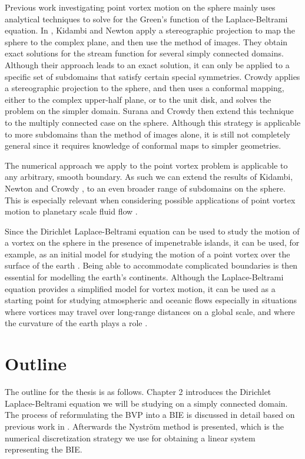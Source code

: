 \documentclass{sfuthesis}
\begin{document}
Previous work investigating point vortex motion on the sphere mainly uses analytical techniques to solve for the Green's function of the Laplace-Beltrami equation. In \cite{Kid2000}, Kidambi and Newton apply a stereographic projection to map the sphere to the complex plane, and then use the method of images. They obtain exact solutions for the stream function for several simply connected domains. Although their approach leads to an exact solution, it can only be applied to a specific set of subdomains that satisfy certain special symmetries. Crowdy \cite{Crowdy2006} applies a stereographic projection to the sphere, and then uses a conformal mapping, either to the complex upper-half plane, or to the unit disk, and solves the problem on the simpler domain. Surana and Crowdy \cite{SurCrow2008} then extend this technique to the multiply connected case on the sphere. Although this strategy is applicable to more subdomains than the method of images alone, it is still not completely general since it requires knowledge of conformal maps to simpler geometries. 

The numerical approach we apply to the point vortex problem is applicable to any arbitrary, smooth boundary. As such we can extend the results of Kidambi, Newton and Crowdy \cite{Kid2000, Crowdy2006}, to an even broader range of subdomains on the sphere. This is especially relevant when considering possible applications of point vortex motion to planetary scale fluid flow \cite{Newt2001, Crowdy2006, Kid2000, Kid2000Stream}. 

Since the Dirichlet Laplace-Beltrami equation can be used to study the motion of a vortex on the sphere in the presence of impenetrable islands, it can be used, for example, as an initial model for studying the motion of a point vortex over the surface of the earth \cite{Newt2001}. Being able to accommodate complicated boundaries is then essential for modelling the earth's continents. Although the Laplace-Beltrami equation provides a simplified model for vortex motion, it can be used as a starting point for studying atmospheric and oceanic flows especially in situations where vortices may travel over long-range distances on a global scale, and where the curvature of the earth plays a role \cite{Newt2001,Crowdy2006, Kid2000, Kid2000Stream}. 

\section{Outline}
The outline for the thesis is as follows. Chapter 2 introduces the Dirichlet Laplace-Beltrami equation we will be studying on a simply connected domain. The process of reformulating the BVP into a BIE is discussed in detail based on previous work in \cite{KropNig2014}. Afterwards the Nystr\"{o}m method is presented, which is the numerical discretization strategy we use for obtaining a linear system representing the BIE. 
\end{document}

